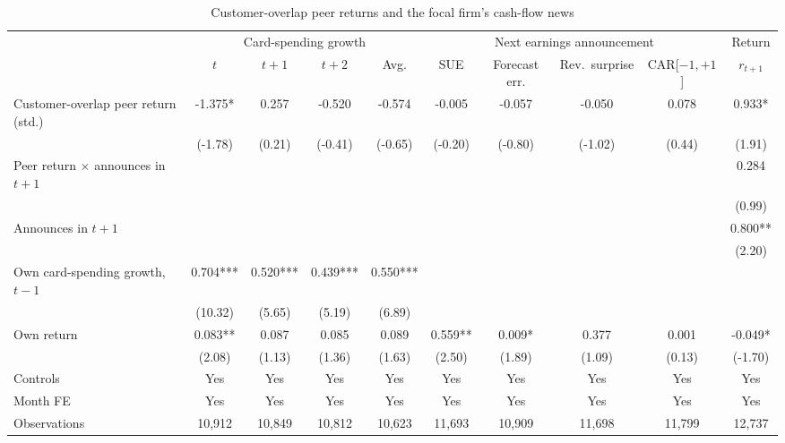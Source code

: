 \begin{table}\centering
\caption{Customer-overlap peer returns and the focal firm's cash-flow news}\label{tab:cfnews}
\scriptsize
\begin{tabular*}{\linewidth}{@{\extracolsep{\fill}}lccccccccc}
\toprule
 & \multicolumn{4}{c}{Card-spending growth} & \multicolumn{4}{c}{Next earnings announcement} & Return \\
\cmidrule(lr){2-5}\cmidrule(lr){6-9}\cmidrule(lr){10-10}
 & $t$ & $t+1$ & $t+2$ & Avg. & SUE & Forecast err. & Rev.\ surprise & CAR[$-1,+1$] & $r_{t+1}$ \\
\midrule
Customer-overlap peer return (std.) & -1.375* & 0.257 & -0.520 & -0.574 & -0.005 & -0.057 & -0.050 & 0.078 & 0.933* \\
 & (-1.78) & (0.21) & (-0.41) & (-0.65) & (-0.20) & (-0.80) & (-1.02) & (0.44) & (1.91) \\
Peer return $\times$ announces in $t+1$ &  &  &  &  &  &  &  &  & 0.284 \\
 &  &  &  &  &  &  &  &  & (0.99) \\
Announces in $t+1$ &  &  &  &  &  &  &  &  & 0.800** \\
 &  &  &  &  &  &  &  &  & (2.20) \\
Own card-spending growth, $t-1$ & 0.704*** & 0.520*** & 0.439*** & 0.550*** &  &  &  &  &  \\
 & (10.32) & (5.65) & (5.19) & (6.89) &  &  &  &  &  \\
Own return & 0.083** & 0.087 & 0.085 & 0.089 & 0.559** & 0.009* & 0.377 & 0.001 & -0.049* \\
 & (2.08) & (1.13) & (1.36) & (1.63) & (2.50) & (1.89) & (1.09) & (0.13) & (-1.70) \\
\addlinespace
Controls & Yes & Yes & Yes & Yes & Yes & Yes & Yes & Yes & Yes \\
Month FE & Yes & Yes & Yes & Yes & Yes & Yes & Yes & Yes & Yes \\
Observations & 10,912 & 10,849 & 10,812 & 10,623 & 11,693 & 10,909 & 11,698 & 11,799 & 12,737 \\
\bottomrule
\end{tabular*}

\end{table}
